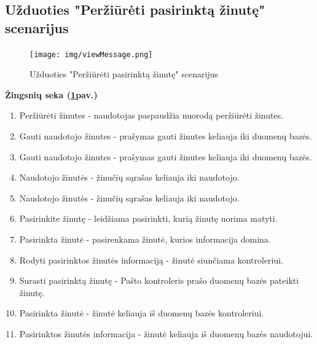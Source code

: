 \documentclass{VUMIFPSkursinis}
\begin{document}
\subsection{Užduoties "Peržiūrėti pasirinktą žinutę" scenarijus}
\begin{figure}[H]
	\centering
	\texttt{[image: img/viewMessage.png]}
	\caption{Užduoties "Peržiūrėti pasirinktą žinutę" scenarijus}
	\label{fig:viewMess}
\end{figure}
\textbf{Žingsnių seka (\ref{fig:viewMess}pav.)}\\
\begin{enumerate}
	\item Peržiūrėti žinutes - naudotojas paspaudžia nuorodą peržiūrėti žinutes.
	\item Gauti naudotojo žinutes - prašymas gauti žinutes keliauja iki duomenų bazės.
	\item Gauti naudotojo žinutes - prašymas gauti žinutes keliauja iki duomenų bazės.
	\item Naudotojo žinutės - žinučių sąrašas keliauja iki naudotojo.
	\item Naudotojo žinutės - žinučių sąrašas keliauja iki naudotojo.
	\item Pasirinkite žinutę - leidžiama pasirinkti, kurią žinutę norima matyti.
	\item Pasirinkta žinutė - pasirenkama žinutė, kurios informacija domina.
	\item Rodyti pasirinktos žinutės informaciją - žinutė siunčiama kontroleriui.
	\item Surasti pasirinktą žinutę - Pašto kontroleris prašo duomenų bazės pateikti žinutę.
	\item Pasirinkta žinutė - žinutė keliauja iš duomenų bazės kontroleriui.
	\item Pasirinktos žinutės informacija - žinutė keliauja iš duomenų bazės naudotojui.
\end{enumerate}
\end{document}
